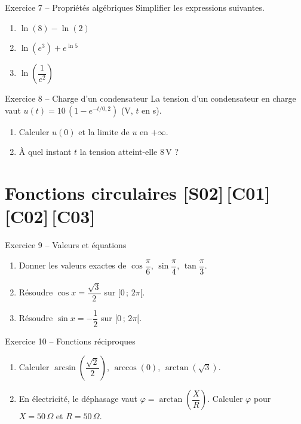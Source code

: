 \documentclass[a4paper,11pt]{article}
\begin{document}
\begin{exo}{Exercice 7 -- Propriétés algébriques}
Simplifier les expressions suivantes.
\begin{enumerate}[label=\alph*)]
  \item $\ln(8) - \ln(2)$
  \item $\ln(e^3) + e^{\ln 5}$
  \item $\ln\!\left(\dfrac{1}{e^2}\right)$
\end{enumerate}
\end{exo}

\begin{exo}{Exercice 8 -- Charge d'un condensateur}
La tension d'un condensateur en charge vaut $u(t) = 10\,(1 - e^{-t/0{,}2})$ (V, $t$ en s).
\begin{enumerate}[label=\alph*)]
  \item Calculer $u(0)$ et la limite de $u$ en $+\infty$.
  \item À quel instant $t$ la tension atteint-elle $8\,$V ?
\end{enumerate}
\end{exo}

\section{Fonctions circulaires \hfill {\normalsize\color{uimmred}[S02]\,[C01]\,[C02]\,[C03]}}

\begin{exo}{Exercice 9 -- Valeurs et équations}
\begin{enumerate}[label=\alph*)]
  \item Donner les valeurs exactes de $\cos\dfrac{\pi}{6}$, $\sin\dfrac{\pi}{4}$, $\tan\dfrac{\pi}{3}$.
  \item Résoudre $\cos x = \dfrac{\sqrt{3}}{2}$ sur $[0\,;\,2\pi[$.
  \item Résoudre $\sin x = -\dfrac{1}{2}$ sur $[0\,;\,2\pi[$.
\end{enumerate}
\end{exo}

\begin{exo}{Exercice 10 -- Fonctions réciproques}
\begin{enumerate}[label=\alph*)]
  \item Calculer $\arcsin\!\left(\dfrac{\sqrt{2}}{2}\right)$, $\arccos(0)$, $\arctan(\sqrt{3})$.
  \item En électricité, le déphasage vaut $\varphi = \arctan\!\left(\dfrac{X}{R}\right)$. Calculer $\varphi$ pour $X = 50\,\Omega$ et $R = 50\,\Omega$.
\end{enumerate}
\end{exo}
\end{document}
